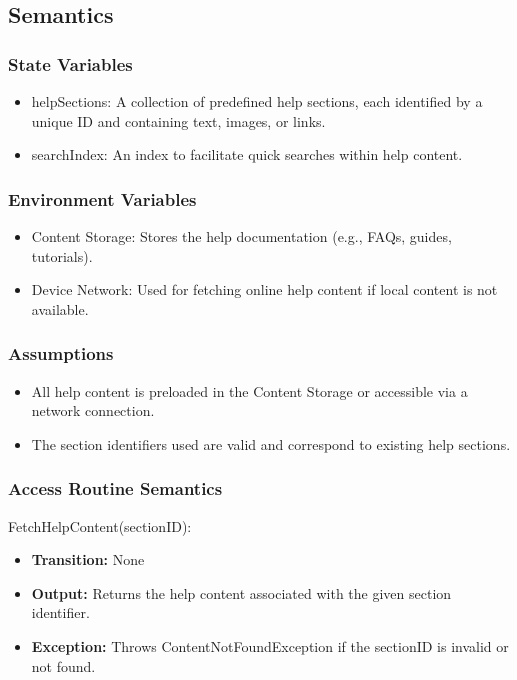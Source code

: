 \documentclass[12pt, titlepage]{article}
\begin{document}
\subsection{Semantics}

\subsubsection{State Variables}

\begin{itemize}
    \item helpSections: A collection of predefined help sections, each identified by a unique ID and containing text, images, or links.
    \item searchIndex: An index to facilitate quick searches within help content.
\end{itemize}

\subsubsection{Environment Variables}

\begin{itemize}
    \item Content Storage: Stores the help documentation (e.g., FAQs, guides, tutorials).
    \item Device Network: Used for fetching online help content if local content is not available.
\end{itemize}

\subsubsection{Assumptions}

\begin{itemize}
    \item All help content is preloaded in the Content Storage or accessible via a network connection.
    \item The section identifiers used are valid and correspond to existing help sections.
\end{itemize}

\subsubsection{Access Routine Semantics}

\noindent FetchHelpContent(sectionID):
\begin{itemize}
    \item \textbf{Transition:} None
    \item \textbf{Output:} Returns the help content associated with the given section identifier.
    \item \textbf{Exception:} Throws ContentNotFoundException if the sectionID is invalid or not found.
\end{itemize}
\end{document}

